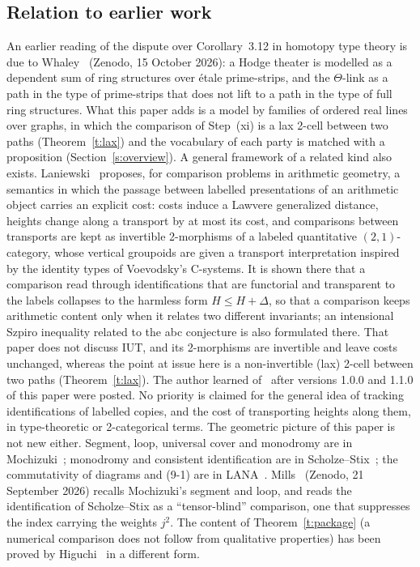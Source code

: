 \documentclass[11pt,a4paper]{article}
\newcommand{\q}[1]{``#1''}
\theoremstyle{plain}
\theoremstyle{definition}
\theoremstyle{remark}
\begin{document}
\subsection{Relation to earlier work}\label{ss:earlier}
An earlier reading of the dispute over Corollary~3.12 in homotopy type theory is due to Whaley~\cite{Wh} (Zenodo,
15 October 2026): a Hodge theater is modelled as a dependent sum of ring structures over \'etale prime-strips, and the
$\Theta$-link as a path in the type of prime-strips that does not lift to a path in the type of full ring structures.
What this paper adds is a model by families of ordered real lines over graphs, in which the comparison of Step~(xi) is
a lax 2-cell between two paths (Theorem~\ref{t:lax}) and the vocabulary of each party is matched with a proposition
(Section~\ref{s:overview}). A general framework of a related kind also exists. Laniewski~\cite{La} proposes, for comparison problems
in arithmetic geometry, a semantics in which the passage between labelled presentations of an arithmetic object
carries an explicit cost: costs induce a Lawvere generalized distance, heights change along a transport by at most its
cost, and comparisons between transports are kept as invertible 2-morphisms of a labeled quantitative
$(2,1)$-category, whose vertical groupoids are given a transport interpretation inspired by the identity types of
Voevodsky's C-systems. It is shown there that a comparison read through identifications that are functorial and
transparent to the labels collapses to the harmless form $H\le H+\Delta$, so that a comparison keeps arithmetic content
only when it relates two different invariants; an intensional Szpiro inequality related to the abc conjecture is also
formulated there. That paper does not discuss IUT, and its 2-morphisms are invertible and leave costs unchanged,
whereas the point at issue here is a non-invertible (lax) 2-cell between two paths (Theorem~\ref{t:lax}). The author
learned of~\cite{La} after versions 1.0.0 and 1.1.0 of this paper were posted. No priority is claimed for the general
idea of tracking identifications of labelled copies, and the cost of transporting heights along them, in
type-theoretic or 2-categorical terms. The geometric picture of this paper is not new either. Segment, loop, universal cover and monodromy are in
Mochizuki~\cite[(LbEx1)]{R18}; monodromy and consistent identification are in Scholze--Stix~\cite[\S2.2]{SS}; the
commutativity of diagrams and (9-1) are in LANA~\cite[\S0.2, \S\S9--10]{LANA}. Mills~\cite[\S18]{Mi} (Zenodo,
21 September 2026) recalls Mochizuki's segment and loop, and reads the identification of Scholze--Stix as a
\q{tensor-blind} comparison, one that suppresses the index carrying the weights $j^2$. The content of
Theorem~\ref{t:package} (a numerical comparison does not follow from qualitative properties) has been proved by
Higuchi~\cite{Hi} in a different form.
\end{document}
